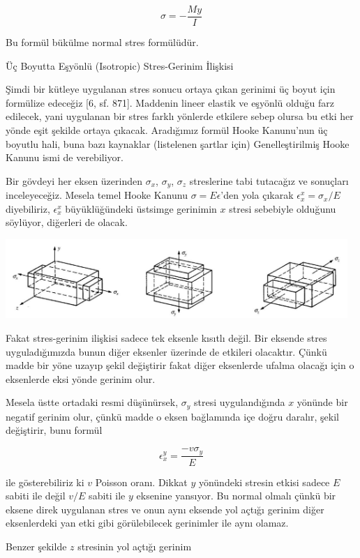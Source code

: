 \documentclass[12pt,fleqn]{article}\usepackage{../../common}
\begin{document}
$$
\sigma = - \frac{M y}{I}
$$

Bu formül bükülme normal stres formülüdür.


Üç Boyutta Eşyönlü (Isotropic) Stres-Gerinim İlişkisi 

Şimdi bir kütleye uygulanan stres sonucu ortaya çıkan gerinimi üç boyut için
formülize edeceğiz [6, sf. 871]. Maddenin lineer elastik ve eşyönlü olduğu farz
edilecek, yani uygulanan bir stres farklı yönlerde etkilere sebep olursa bu etki
her yönde eşit şekilde ortaya çıkacak. Aradığımız formül Hooke Kanunu'nun üç
boyutlu hali, buna bazı kaynaklar (listelenen şartlar için) Genelleştirilmiş
Hooke Kanunu ismi de verebiliyor.

Bir gövdeyi her eksen üzerinden $\sigma_x$, $\sigma_y$, $\sigma_z$ streslerine
tabi tutacağız ve sonuçları inceleyeceğiz. Mesela temel Hooke Kanunu $\sigma = E
\epsilon$'den yola çıkarak $\epsilon_x^x = \sigma_x / E$ diyebiliriz,
$\epsilon_x^x$ büyüklüğündeki üstsimge gerinimin $x$ stresi sebebiyle olduğunu
söylüyor, diğerleri de olacak.

\includegraphics[width=35em]{phy_020_strs_00_10.jpg}

Fakat stres-gerinim ilişkisi sadece tek eksenle kısıtlı değil. Bir eksende stres
uyguladığımızda bunun diğer eksenler üzerinde de etkileri olacaktır.  Çünkü
madde bir yöne uzayıp şekil değiştirir fakat diğer eksenlerde ufalma olacağı
için o eksenlerde eksi yönde gerinim olur.

Mesela üstte ortadaki resmi düşünürsek, $\sigma_y$ stresi uygulandığında $x$
yönünde bir negatif gerinim olur, çünkü madde o eksen bağlamında içe doğru
daralır, şekil değiştirir, bunu formül

$$
\epsilon_x^y =  \frac{- v \sigma_y}{E}
$$

ile gösterebiliriz ki $v$ Poisson oranı. Dikkat $y$ yönündeki stresin etkisi
sadece $E$ sabiti ile değil $v/E$ sabiti ile $y$ eksenine yansıyor. Bu normal
olmalı çünkü bir eksene direk uygulanan stres ve onun aynı eksende yol açtığı
gerinim diğer eksenlerdeki yan etki gibi görülebilecek gerinimler ile aynı
olamaz.

Benzer şekilde $z$ stresinin yol açtığı gerinim
\end{document}
